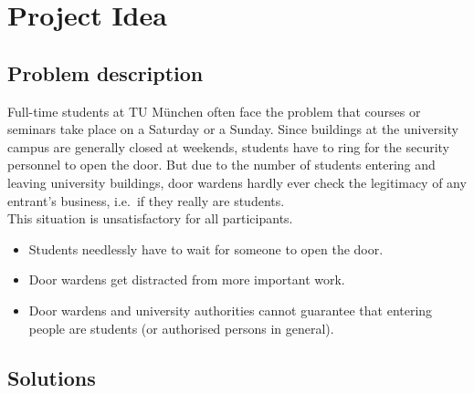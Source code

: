 \section{Project Idea}

\subsection{Problem description}

Full-time students at TU München often face the problem that courses or seminars take place on a Saturday or a Sunday.
Since buildings at the university campus are generally closed at weekends, students have to ring for the security personnel to open the door. But due to the number of students entering and leaving university buildings, door wardens hardly ever check the legitimacy of any entrant's business, i.e.~if they really are students.\\
This situation is unsatisfactory for all participants.

\begin{itemize}
\item Students needlessly have to wait for someone to open the door.
\item Door wardens get distracted from more important work.
\item Door wardens and university authorities cannot guarantee that entering people are students (or authorised persons in general).
\end{itemize}

\subsection{Solutions}
